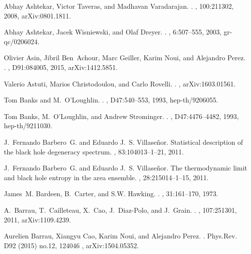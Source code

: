\documentclass[aps, nofootinbib,superscriptaddress,12pt]{revtex4-2}
\begin{document}
\begin{thebibliography}{100}
Abhay Ashtekar, Victor Taveras, and Madhavan Varadarajan.
.
, 100:211302, 2008, arXiv:0801.1811.

Abhay Ashtekar, Jacek Wisniewski, and Olaf Dreyer.
.
, 6:507--555, 2003, gr-qc/0206024.

Olivier Asin, Jibril Ben~Achour, Marc Geiller, Karim Noui, and Alejandro Perez.
.
, D91:084005, 2015, arXiv:1412.5851.

Valerio Astuti, Marios Christodoulou, and Carlo Rovelli.
.
, arXiv:1603.01561.

Tom Banks and M.~O'Loughlin.
.
, D47:540--553, 1993, hep-th/9206055.

Tom Banks, M.~O'Loughlin, and Andrew Strominger.
.
, D47:4476--4482, 1993, hep-th/9211030.

J.~Fernando Barbero~G. and Eduardo J.~S. Villase\~nor.
\newblock Statistical description of the black hole degeneracy spectrum.
, 83:104013--1--21, 2011.

J.~Fernando Barbero~G. and Eduardo J.~S. Villase\~nor.
\newblock The thermodynamic limit and black hole entropy in the area ensemble.
, 28:215014--1--15, 2011.

James~M. Bardeen, B.~Carter, and S.W. Hawking.
.
, 31:161--170, 1973.

A.~Barrau, T.~Cailleteau, X.~Cao, J.~Diaz-Polo, and J.~Grain.
.
, 107:251301, 2011, arXiv:1109.4239.

Aurelien Barrau, Xiangyu Cao, Karim Noui, and Alejandro Perez.
.
\newblock Phys.Rev. D92 (2015) no.12, 124046 
, arXiv:1504.05352.


\end{thebibliography}
\end{document}
